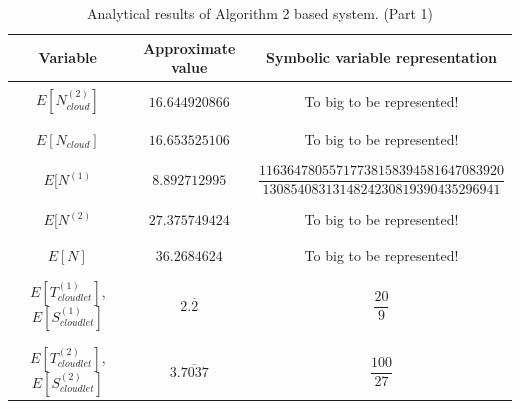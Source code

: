 \documentclass[10pt,a4paper]{article}
\begin{document}
\begin{table}[h!]
\caption{Analytical results of Algorithm 2 based system. (Part 1)}
\begin{adjustbox}{center=\textwidth}
	
     \begin{tabular}{c|c|c}
     \toprule
     \textbf{Variable} & \textbf{Approximate value} & \textbf{Symbolic variable representation} \\
     \toprule
	 
	 &&\\

	 $E[N^{(2)}_{cloud}]$ & $16.644920866$ & To big to be represented! \\

	 &&\\\hline &&\\
	
	 $E[N_{cloud}]$ & $16.653525106$ & To big to be represented! \\

     &&\\\hline &&\\

     $E[N^{(1)}$ & $8.892712995$ & $\dfrac{11636478055717738158394581647083920}{1308540831314824230819390435296941}$ \\

     &&\\\hline &&\\

	 $E[N^{(2)}$ & $27.375749424$ & To big to be represented! \\
	 
	 &&\\\hline &&\\
	 
	 $E[N]$ & $36.2684624$ & To big to be represented! \\

	 &&\\\hline &&\\

	 $E[T^{(1)}_{cloudlet}]$, $E[S^{(1)}_{cloudlet}]$ & $2.\overline{2}$ & $\dfrac{20}{9}$  \\
     
     &&\\\hline &&\\
     
     $E[T^{(2)}_{cloudlet}]$, $E[S^{(2)}_{cloudlet}]$ & $3.\overline{7037}$ & $\dfrac{100}{27}$  \\
     

\end{tabular}
\end{adjustbox}
\end{table}
\end{document}

